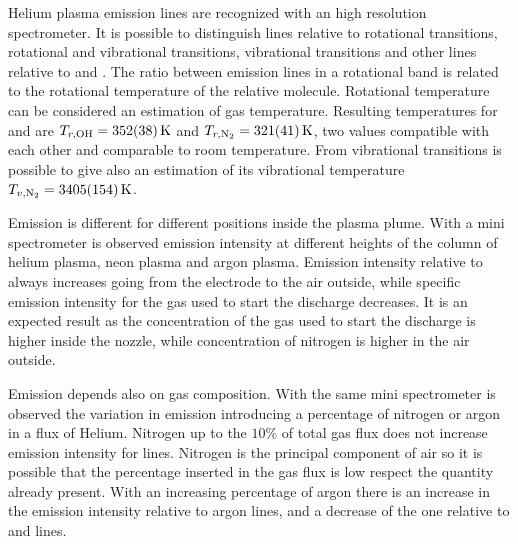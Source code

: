 Helium plasma emission lines are recognized with an high resolution spectrometer. It is possible to distinguish lines relative to  rotational transitions,  rotational and vibrational transitions,  vibrational transitions and other lines relative to  and .
The ratio between emission lines in a rotational band is related to the rotational temperature of the relative molecule. Rotational temperature can be considered an estimation of gas temperature. Resulting temperatures for  and  are $T_{r,\ce{OH}} = \SI{352(38)}{\kelvin}$ and $T_{r,\ce{N_2}} = \SI{321(41)}{\kelvin}$, two values compatible with each other and comparable to room temperature. From  vibrational transitions is possible to give also an estimation of its vibrational temperature $T_{v,\ce{N_2}} = \SI{3405(154)}{\kelvin}$.

Emission is different for different positions inside the plasma plume. With a mini spectrometer is observed emission intensity at different heights of the column of helium plasma, neon plasma and argon plasma. Emission intensity relative to  always increases going from the electrode to the air outside, while specific emission intensity for the gas used to start the discharge decreases. It is an expected result as the concentration of the gas used to start the discharge is higher inside the nozzle, while concentration of nitrogen is higher in the air outside.

Emission depends also on gas composition. With the same mini spectrometer is observed the variation in emission introducing a percentage of nitrogen or argon in a flux of Helium. Nitrogen up to the $10\%$ of total gas flux does not increase emission intensity for  lines. Nitrogen is the principal component of air so it is possible that the percentage inserted in the gas flux is low respect the quantity already present.
With an increasing percentage of argon there is an increase in the emission intensity relative to argon lines, and a decrease of the one relative to  and  lines.


